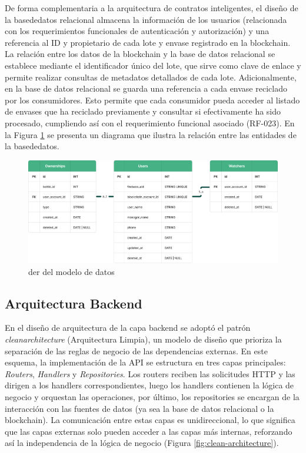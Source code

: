 De forma complementaria a la arquitectura de contratos inteligentes, el diseño de la \gls{basededatos} relacional almacena la información de los usuarios (relacionada con los requerimientos funcionales de autenticación y autorización) y una referencia al ID y propietario de cada lote y envase registrado en la blockchain. La relación entre los datos de la blockchain y la base de datos relacional se establece mediante el identificador único del lote, que sirve como clave de enlace y permite realizar consultas de metadatos detallados de cada lote. Adicionalmente, en la base de datos relacional se guarda una referencia a cada envase reciclado por los consumidores. Esto permite que cada consumidor pueda acceder al listado de envases que ha reciclado previamente y consultar si efectivamente ha sido procesado, cumpliendo así con el requerimiento funcional asociado (RF-023). En la Figura \ref{fig:der} se presenta un diagrama que ilustra la relación entre las entidades de la \gls{basededatos}.

\begin{figure}[!t]
    \centering
    \includegraphics[width=\textwidth]{Figures/db-der.png}
    \caption{\acrfull{der} del modelo de datos}
    \label{fig:der}
\end{figure}

\subsection{Arquitectura Backend}

En el diseño de arquitectura de la capa \gls{backend} se adoptó el patrón \textit{\Gls{cleanarchitecture}} (Arquitectura Limpia), un modelo de diseño que prioriza la separación de las reglas de negocio de las dependencias externas. En este esquema, la implementación de la API se estructura en tres capas principales: \textit{Routers}, \textit{Handlers} y \textit{Repositories}. Los routers reciben las solicitudes HTTP y las dirigen a los handlers correspondientes, luego los handlers contienen la lógica de negocio y orquestan las operaciones, por último, los repositories se encargan de la interacción con las fuentes de datos (ya sea la base de datos relacional o la blockchain). La comunicación entre estas capas es unidireccional, lo que significa que las capas externas solo pueden acceder a las capas más internas, reforzando así la independencia de la lógica de negocio (Figura \ref{fig:clean-architecture}).

